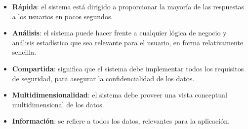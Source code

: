 \documentclass{fancyslides}
\begin{document}
\begin{frame}
\misc
{
\begin{itemize}
  \item \textbf{Rápida}: el sistema está dirigido a proporcionar la mayoría de las respuestas a los usuarios en pocos segundos.
  \item \textbf{Análisis}: el sistema puede hacer frente a cualquier lógica de negocio y análisis estadístico que sea relevante para el usuario, en forma relativamente sencilla.
  \item \textbf{Compartida}: significa que el sistema debe implementar todos los requisitos de seguridad, para asegurar la confidencialidad de los datos.
  \item \textbf{Multidimensionalidad}: el sistema debe proveer una vista conceptual multidimensional de los datos.
  \item \textbf{Información}: se refiere a todos los datos, relevantes para la aplicación.
\end{itemize}
}
\end{frame}


\begin{frame}
\end{frame}

\begin{frame}
\end{frame}

\begin{frame}
\end{frame}

\begin{frame}
\end{frame}

\begin{frame}
\end{frame}
\end{document}
